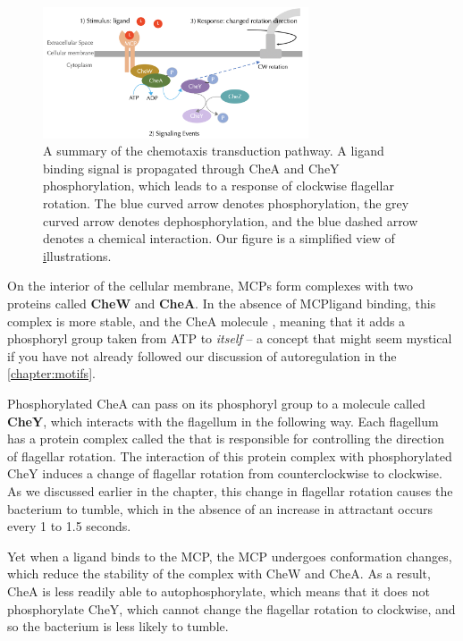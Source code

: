 \begin{figure}[h]
\centering
\mySfFamily
\includegraphics[width = 0.7\textwidth]{../images/chemotaxisphosnew.png}
\caption{A summary of the chemotaxis transduction pathway. A ligand binding signal is propagated through CheA and CheY phosphorylation, which leads to a response of clockwise flagellar rotation. The blue curved arrow denotes phosphorylation, the grey curved arrow denotes dephosphorylation, and the blue dashed arrow denotes a chemical interaction. Our figure is a simplified view of \href{http://chemotaxis.biology.utah.edu/Parkinson_Lab/projects/ecolichemotaxis/ecolichemotaxis.html} illustrations.}
\label{fig:chemotaxisphosnew}
\end{figure}


On the interior of the cellular membrane, MCPs form complexes with two proteins called \textbf{CheW} and \textbf{CheA}. In the absence of MCP\-ligand binding, this complex is more stable, and the CheA molecule , meaning that it adds a phosphoryl group taken from ATP to \textit{itself} -- a concept that might seem mystical if you have not already followed our discussion of autoregulation in the \autoref{chapter:motifs}.

Phosphorylated CheA can pass on its phosphoryl group to a molecule called \textbf{CheY}, which interacts with the flagellum in the following way. Each flagellum has a protein complex called the  that is responsible for controlling the direction of flagellar rotation. The interaction of this protein complex with phosphorylated CheY induces a change of flagellar rotation from counter\-clockwise to clockwise. As we discussed earlier in the chapter, this change in flagellar rotation causes the bacterium to tumble, which in the absence of an increase in attractant occurs every 1 to 1.5 seconds.

Yet when a ligand binds to the MCP, the MCP undergoes conformation changes, which reduce the stability of the complex with CheW and CheA. As a result, CheA is less readily able to autophosphorylate, which means that it does not phosphorylate CheY, which cannot change the flagellar rotation to clockwise, and so the bacterium is less likely to tumble.

